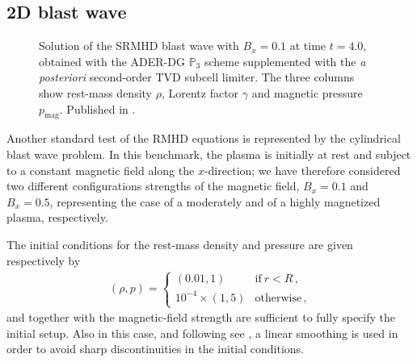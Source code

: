\subsection{2D blast wave}\label{sec:2d-blast-wave}
\begin{figure}[t]

\caption[
   SRMHD blast wave, fields view 
]{Solution of the SRMHD blast wave with
  $B_x=0.1$ at time $t=4.0$, obtained with the ADER-DG $\mathbb{P}_3$
  scheme supplemented with the \textit{a posteriori}  second-order TVD subcell
  limiter. The three columns show rest-mass density $\rho$, Lorentz factor
  $\gamma$ and magnetic pressure $p_\text{mag}$.
  Published in \cite{Fambri2018}.
 }
\end{figure}
%
%
Another standard test of the RMHD equations is represented by the 
cylindrical blast wave problem. In this benchmark, the plasma is 
initially at rest and subject to a constant magnetic field along the
$x$-direction; we have therefore considered two different configurations
strengths of the magnetic field, \ie $B_x = 0.1$ and $B_x= 0.5$,
representing the case of a moderately and of a highly magnetized plasma,
respectively.

The initial conditions for the rest-mass density and
pressure are given respectively by
%
\begin{align}
  (\rho, p ) = \left\{\begin{array}{lr} (0.01, 1)
  & \text{if} \  r<R \,, \\
  10^{-4} \times (1,5) & \text{otherwise}\,,
  \end{array}\right.
\end{align}
%
and together with the magnetic-field strength are sufficient to fully
specify the initial setup. Also in this case, and following see
\cite{Balsara1999b}, a linear smoothing is used in order to avoid sharp  
discontinuities in the initial conditions. 

